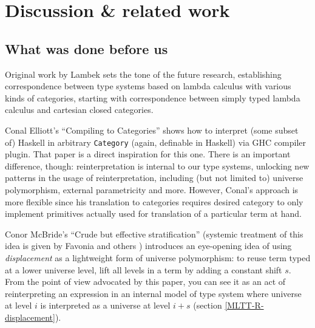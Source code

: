 \section{Discussion \& related work}

\subsection{What was done before us}

Original work by Lambek \cite{Lambek1980} sets the tone
of the future research, establishing correspondence
between type systems based on lambda calculus with
various kinds of categories, starting with
correspondence between simply typed lambda calculus and
cartesian closed categories.

Conal Elliott's ``Compiling to Categories''
\cite{Elliott:Compcat2017} shows how to interpret (some
subset of) Haskell in arbitrary \texttt{Category}
(again, definable in Haskell) via GHC compiler plugin.
That paper is a direct inspiration for this one. There
is an important difference, though: reinterpretation is
internal to our type systems, unlocking new patterns in
the usage of reinterpretation, including (but not
limited to) universe polymorphism, external
parametricity and more. However, Conal's approach is
more flexible since his translation to categories
requires desired category to only implement primitives
actually used for translation of a particular term at
hand.

Conor McBride's ``Crude but effective stratification''
\cite{McBride:Crude2011, McBride:Crude2012} (systemic
treatment of this idea is given by Favonia and others
\cite{Favonia:Displacement2023}) introduces an
eye-opening idea of using \textit{displacement} as a
lightweight form of universe polymorphism: to reuse term
typed at a lower universe level, lift all levels in a
term by adding a constant shift $s$. From the point of
view advocated by this paper, you can see it as an act
of reinterpreting an expression in an internal model of
type system where universe at level $i$ is interpreted
as a universe at level $i+s$ (section
\ref{MLTT-R-displacement}).

